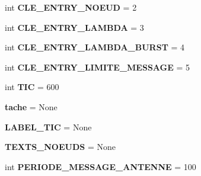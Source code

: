 \begin{DoxyCompactItemize}
\item 
int {\bfseries C\+L\+E\+\_\+\+E\+N\+T\+R\+Y\+\_\+\+N\+O\+E\+UD} = 2\hypertarget{namespacesimulation__v2_ab3b3858f207a82848aba34ad42f2ca11}{}\label{namespacesimulation__v2_ab3b3858f207a82848aba34ad42f2ca11}

\item 
int {\bfseries C\+L\+E\+\_\+\+E\+N\+T\+R\+Y\+\_\+\+L\+A\+M\+B\+DA} = 3\hypertarget{namespacesimulation__v2_a11c14df81e02e221ab75aa53b4826d18}{}\label{namespacesimulation__v2_a11c14df81e02e221ab75aa53b4826d18}

\item 
int {\bfseries C\+L\+E\+\_\+\+E\+N\+T\+R\+Y\+\_\+\+L\+A\+M\+B\+D\+A\+\_\+\+B\+U\+R\+ST} = 4\hypertarget{namespacesimulation__v2_a0f08998070927b8154f4ebad40db15bc}{}\label{namespacesimulation__v2_a0f08998070927b8154f4ebad40db15bc}

\item 
int {\bfseries C\+L\+E\+\_\+\+E\+N\+T\+R\+Y\+\_\+\+L\+I\+M\+I\+T\+E\+\_\+\+M\+E\+S\+S\+A\+GE} = 5\hypertarget{namespacesimulation__v2_a28625483a18820c40235f0a3803b5285}{}\label{namespacesimulation__v2_a28625483a18820c40235f0a3803b5285}

\item 
int {\bfseries T\+IC} = 600\hypertarget{namespacesimulation__v2_a4002c61e47cf53fbbec5d18be20169d5}{}\label{namespacesimulation__v2_a4002c61e47cf53fbbec5d18be20169d5}

\item 
{\bfseries tache} = None\hypertarget{namespacesimulation__v2_a4b90f5bc492311ef33ef308f24e14afa}{}\label{namespacesimulation__v2_a4b90f5bc492311ef33ef308f24e14afa}

\item 
{\bfseries L\+A\+B\+E\+L\+\_\+\+T\+IC} = None\hypertarget{namespacesimulation__v2_a3d62174b6d040b708360b5482d8bbb17}{}\label{namespacesimulation__v2_a3d62174b6d040b708360b5482d8bbb17}

\item 
{\bfseries T\+E\+X\+T\+S\+\_\+\+N\+O\+E\+U\+DS} = None\hypertarget{namespacesimulation__v2_a76da82fda28df79f14f593863f910e02}{}\label{namespacesimulation__v2_a76da82fda28df79f14f593863f910e02}

\item 
int {\bfseries P\+E\+R\+I\+O\+D\+E\+\_\+\+M\+E\+S\+S\+A\+G\+E\+\_\+\+A\+N\+T\+E\+N\+NE} = 100\hypertarget{namespacesimulation__v2_a59ae5fc7c5b8ac91cb74774ccdeea479}{}\label{namespacesimulation__v2_a59ae5fc7c5b8ac91cb74774ccdeea479}


\end{DoxyCompactItemize}
